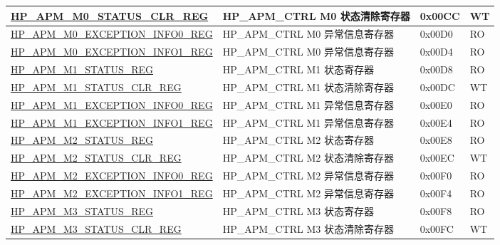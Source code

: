 \begin{longtable}{ | L{6.5cm} | L{6cm} | l | l | }
\hyperref[regdesc:HPAPMM0STATUSCLRREG]{HP\_APM\_M0\_STATUS\_CLR\_REG} & HP\_APM\_CTRL M0 状态清除寄存器 & 0x00CC & WT \\ \hline

\hyperref[regdesc:HPAPMM0EXCEPTIONINFO0REG]{HP\_APM\_M0\_EXCEPTION\_INFO0\_REG} & HP\_APM\_CTRL M0 异常信息寄存器 & 0x00D0 & RO \\ \hline

\hyperref[regdesc:HPAPMM0EXCEPTIONINFO1REG]{HP\_APM\_M0\_EXCEPTION\_INFO1\_REG} & HP\_APM\_CTRL M0 异常信息寄存器 & 0x00D4 & RO \\ \hline

\hyperref[regdesc:HPAPMM1STATUSREG]{HP\_APM\_M1\_STATUS\_REG} & HP\_APM\_CTRL M1 状态寄存器 & 0x00D8 & RO \\ \hline

\hyperref[regdesc:HPAPMM1STATUSCLRREG]{HP\_APM\_M1\_STATUS\_CLR\_REG} & HP\_APM\_CTRL M1 状态清除寄存器 & 0x00DC & WT \\ \hline

\hyperref[regdesc:HPAPMM1EXCEPTIONINFO0REG]{HP\_APM\_M1\_EXCEPTION\_INFO0\_REG} & HP\_APM\_CTRL M1 异常信息寄存器 & 0x00E0 & RO \\ \hline

\hyperref[regdesc:HPAPMM1EXCEPTIONINFO1REG]{HP\_APM\_M1\_EXCEPTION\_INFO1\_REG} & HP\_APM\_CTRL M1 异常信息寄存器 & 0x00E4 & RO \\ \hline

\hyperref[regdesc:HPAPMM2STATUSREG]{HP\_APM\_M2\_STATUS\_REG} & HP\_APM\_CTRL M2 状态寄存器 & 0x00E8 & RO \\ \hline

\hyperref[regdesc:HPAPMM2STATUSCLRREG]{HP\_APM\_M2\_STATUS\_CLR\_REG} & HP\_APM\_CTRL M2 状态清除寄存器 & 0x00EC & WT \\ \hline

\hyperref[regdesc:HPAPMM2EXCEPTIONINFO0REG]{HP\_APM\_M2\_EXCEPTION\_INFO0\_REG} & HP\_APM\_CTRL M2 异常信息寄存器 & 0x00F0 & RO \\ \hline

\hyperref[regdesc:HPAPMM2EXCEPTIONINFO1REG]{HP\_APM\_M2\_EXCEPTION\_INFO1\_REG} & HP\_APM\_CTRL M2 异常信息寄存器 & 0x00F4 & RO \\ \hline

\hyperref[regdesc:HPAPMM3STATUSREG]{HP\_APM\_M3\_STATUS\_REG} & HP\_APM\_CTRL M3 状态寄存器 & 0x00F8 & RO \\ \hline

\hyperref[regdesc:HPAPMM3STATUSCLRREG]{HP\_APM\_M3\_STATUS\_CLR\_REG} & HP\_APM\_CTRL M3 状态清除寄存器 & 0x00FC & WT \\ \hline


\end{longtable}
